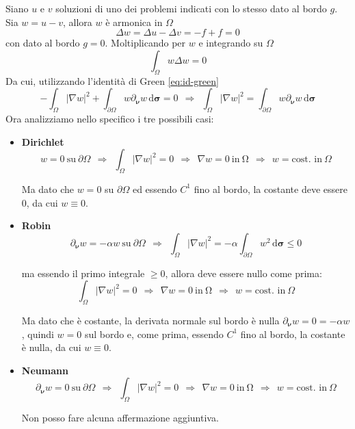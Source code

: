 \documentclass[10pt,a4paper,twoside,openright]{book}
\newcommand{\sigg}{\bm{\sigma}}
\newcommand{\nuu}{\bm{\nu}}
\newcommand{\de}{\,\mathrm d}
\newcommand{\dsig}{\de \sigg}
\begin{document}
\begin{dimostrazione}
	Siano $u$ e $v$ soluzioni di uno dei problemi indicati con lo stesso dato al bordo $g$. Sia $w=u-v$, allora $w$ è armonica in $\Omega $
	\begin{equation*}
		\Delta w=\Delta u-\Delta v=-f+f=0
	\end{equation*}
	con dato al bordo $g=0$. Moltiplicando per $w$ e integrando su $\Omega $
	\begin{equation*}
		\int _{\Omega } w\Delta w=0
	\end{equation*}
	Da cui, utilizzando l'identità di Green \eqref{eq:id-green}
	\begin{equation*}
		-\int _{\Omega }| \nabla w| ^{2} +\int _{\partial \Omega } w\partial _{\nuu} w\dsig =0\ \ \Rightarrow \ \ \int _{\Omega }| \nabla w| ^{2} =\int _{\partial \Omega } w\partial _{\nuu} w\dsig 
	\end{equation*}
	Ora analizziamo nello specifico i tre possibili casi:
	\begin{itemize}
		\item \textbf{Dirichlet}
		\begin{equation*}
		w=0\ \text{su} \ \partial \Omega \ \ \Rightarrow \ \ \int _{\Omega }| \nabla w| ^{2} =0\ \ \Rightarrow \ \ \nabla w=0\ \text{in} \ \mathrm{\Omega } \ \ \Rightarrow \ \ w=\text{cost. in} \ \Omega 
		\end{equation*}

		Ma dato che $w=0$ su $\displaystyle \partial \Omega $ ed essendo $\displaystyle C^{1}$ fino al bordo, la costante deve essere $0$, da cui $\displaystyle w\equiv 0$.
		\item \textbf{Robin}
		\begin{equation*}
		\partial_{\nuu} w=-\alpha w\ \text{su} \ \partial \Omega \ \ \Rightarrow \ \ \int _{\Omega }| \nabla w| ^{2} =-\alpha \int _{\partial \Omega } w^{2} \dsig \leqslant 0
		\end{equation*}

		ma essendo il primo integrale $\displaystyle \geqslant 0$, allora deve essere nullo come prima:
		\begin{equation*}
		\int _{\Omega }| \nabla w| ^{2} =0\ \ \Rightarrow \ \ \nabla w=0\ \text{in} \ \mathrm{\Omega } \ \ \Rightarrow \ \ w=\text{cost. in} \ \Omega 
		\end{equation*}

		Ma dato che è costante, la derivata normale sul bordo è nulla $\displaystyle \partial_{\nuu} w=0=-\alpha w$, quindi $w=0$ sul bordo e, come prima, essendo $\displaystyle C^{1}$ fino al bordo, la costante è nulla, da cui $\displaystyle w\equiv 0$.
		\item \textbf{Neumann}
		\begin{equation*}
		\partial_{\nuu} w=0\ \text{su} \ \partial \Omega \ \ \Rightarrow \ \ \int _{\Omega }| \nabla w| ^{2} =0\ \ \Rightarrow \ \ \nabla w=0\ \text{in} \ \mathrm{\Omega } \ \ \Rightarrow \ \ w=\text{cost. in} \ \Omega 
		\end{equation*}

		Non posso fare alcuna affermazione aggiuntiva.
	\end{itemize}
\end{dimostrazione}
\end{document}
